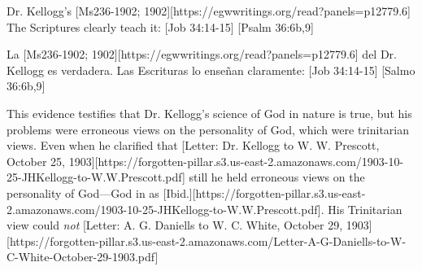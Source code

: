 Dr. Kellogg's [Ms236-1902; 1902][https://egwwritings.org/read?panels=p12779.6] The Scriptures clearly teach it: [Job 34:14-15] [Psalm 36:6b,9]


La [Ms236-1902; 1902][https://egwwritings.org/read?panels=p12779.6] del Dr. Kellogg es verdadera. Las Escrituras lo enseñan claramente: [Job 34:14-15] [Salmo 36:6b,9]


This evidence testifies that Dr. Kellogg's science of God in nature is true, but his problems were erroneous views on the personality of God, which were trinitarian views. Even when he clarified that [Letter: Dr. Kellogg to W. W. Prescott, October 25, 1903][https://forgotten-pillar.s3.us-east-2.amazonaws.com/1903-10-25-JHKellogg-to-W.W.Prescott.pdf] still he held erroneous views on the personality of God—God in  as [Ibid.][https://forgotten-pillar.s3.us-east-2.amazonaws.com/1903-10-25-JHKellogg-to-W.W.Prescott.pdf]. His Trinitarian view could \textit{not} [Letter: A. G. Daniells to W. C. White, October 29, 1903][https://forgotten-pillar.s3.us-east-2.amazonaws.com/Letter-A-G-Daniells-to-W-C-White-October-29-1903.pdf]



